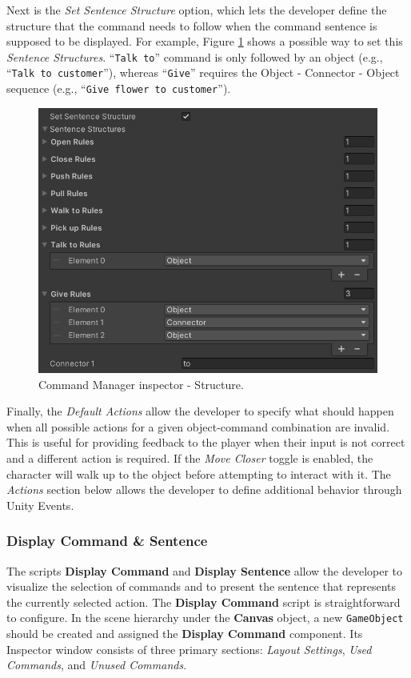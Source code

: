 Next is the \textit{Set Sentence Structure} option, which lets the developer define the structure that the command needs to follow when the command sentence is supposed to be displayed. For example, Figure \ref{fig:Manual-CM3} shows a possible way to set this \textit{Sentence Structures}. “\verb|Talk to|” command is only followed by an object (e.g., “\verb|Talk to customer|”), whereas “\verb|Give|” requires the Object - Connector - Object sequence (e.g., “\verb|Give flower to customer|”).

\begin{figure}[H]
\centering
\includegraphics[width=.8\linewidth]{img/User doc/image_2025-07-04_203654317.png}
\caption{Command Manager inspector - Structure.}
\label{fig:Manual-CM3}
\end{figure}

Finally, the \textit{Default Actions} allow the developer to specify what should happen when all possible actions for a given object-command combination are invalid. This is useful for providing feedback to the player when their input is not correct and a different action is required. If the \textit{Move Closer} toggle is enabled, the character will walk up to the object before attempting to interact with it. The \textit{Actions} section below allows the developer to define additional behavior through Unity Events.

\subsubsection{Display Command \& Sentence }
\label{Manual:Display-C&S}
The scripts \textbf{Display Command} and \textbf{Display Sentence} allow the developer to visualize the selection of commands and to present the sentence that represents the currently selected action. The \textbf{Display Command} script is straightforward to configure. In the scene hierarchy under the \textbf{Canvas} object, a new \verb|GameObject| should be created and assigned the \textbf{Display Command} component. Its Inspector window consists of three primary sections: \textit{Layout Settings}, \textit{Used Commands}, and \textit{Unused Commands}.

